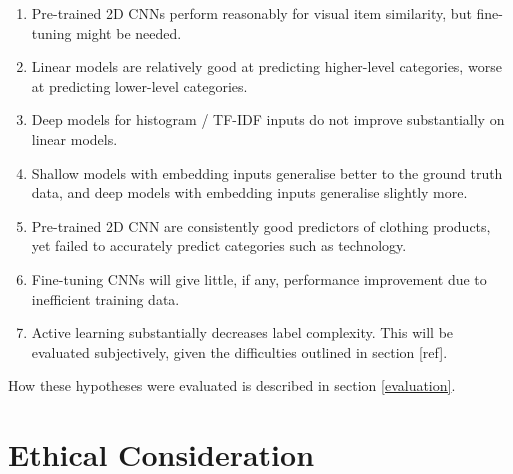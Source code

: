 \begin{enumerate}
  \item Pre-trained 2D CNNs perform reasonably for visual item similarity, but fine-tuning might be needed.
  \item Linear models are relatively good at predicting higher-level categories, worse at predicting lower-level categories.
  \item Deep models for histogram / TF-IDF inputs do not improve substantially on linear models.
  \item Shallow models with embedding inputs generalise better to the ground truth data, and deep models with embedding inputs generalise slightly more.
  \item Pre-trained 2D CNN are consistently good predictors  of clothing products, yet failed to accurately predict categories such as technology.
  \item Fine-tuning CNNs  will give little, if any,  performance  improvement due to inefficient training data.


  \item Active learning substantially decreases label complexity.  This will be evaluated subjectively, given the  difficulties outlined in section [ref].
\end{enumerate}

\hfill \break
How these hypotheses were evaluated is described in section \ref{evaluation}.


\section{Ethical Consideration}


